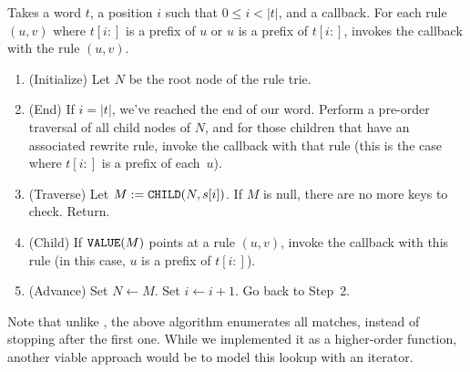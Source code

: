 \documentclass[../generics]{subfiles}
\begin{document}
\begin{algorithm}\label{overlap trie lookup}
Takes a word $t$, a position $i$ such that $0\leq i<|t|$, and a callback. For each rule $(u, v)$ where $t[i:]$ is a prefix of $u$ or $u$ is a prefix of $t[i:]$, invokes the callback with the rule $(u, v)$.
\begin{enumerate}
\item (Initialize) Let $N$ be the root node of the rule trie.
\item (End) If $i=|t|$, we've reached the end of our word. Perform a pre-order traversal of all child nodes of $N$, and for those children that have an associated rewrite rule, invoke the callback with that rule (this is the case where $t[i:]$ is a prefix of each~$u$).
\item (Traverse) Let $M := \texttt{CHILD}(N,s[i])$. If $M$ is null, there are no more keys to check. Return.
\item (Child) If $\texttt{VALUE}(M)$ points at a rule $(u, v)$, invoke the callback with this rule (in this case, $u$ is a prefix of $t[i:]$).
\item (Advance) Set $N \leftarrow M$. Set $i \leftarrow i+1$. Go back to Step~2.
\end{enumerate}
\end{algorithm}

Note that unlike , the above algorithm enumerates all matches, instead of stopping after the first one. While we implemented it as a higher-order function, another viable approach would be to model this lookup with an iterator.
\end{document}
